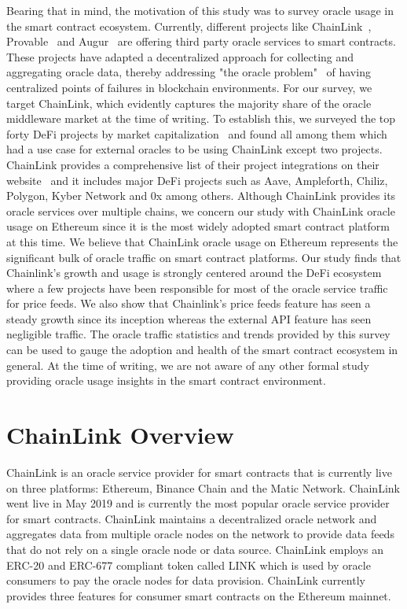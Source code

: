 \documentclass[runningheads]{llncs}
\begin{document}
Bearing that in mind, the motivation of this study was to survey oracle usage in the smart contract ecosystem. Currently, different projects like ChainLink~\cite{chainlink}, Provable~\cite{provable} and Augur~\cite{augur} are offering third party oracle services to smart contracts. These projects have adapted a decentralized approach for collecting and aggregating oracle data, thereby addressing "the oracle problem"~\cite{egberts2017oracle} of having centralized points of failures in blockchain environments. For our survey, we target ChainLink, which evidently captures the majority share of the oracle middleware market at the time of writing. To establish this, we surveyed the top forty DeFi projects by market capitalization~\cite{coinmardefi} and found all among them which had a use case for external oracles to be using ChainLink except two projects. ChainLink provides a comprehensive list of their project integrations on their website~\cite{chainlinkecosys} and it includes major DeFi projects such as Aave, Ampleforth, Chiliz, Polygon, Kyber Network and 0x among others. Although ChainLink provides its oracle services over multiple chains, we concern our study with ChainLink oracle usage on Ethereum since it is the most widely adopted smart contract platform at this time. We believe that ChainLink oracle usage on Ethereum represents the significant bulk of oracle traffic on smart contract platforms. Our study finds that Chainlink's growth and usage is strongly centered around the DeFi ecosystem where a few projects have been responsible for most of the oracle service traffic for price feeds. We also show that Chainlink's price feeds feature has seen a steady growth since its inception whereas the external API feature has seen negligible traffic. The oracle traffic statistics and trends provided by this survey can be used to gauge the adoption and health of the smart contract ecosystem in general.  At the time of writing, we are not aware of any other formal study providing oracle usage insights in the smart contract environment.

\section{ChainLink Overview}
ChainLink is an oracle service provider for smart contracts that is currently live on three platforms: Ethereum, Binance Chain and the Matic Network. ChainLink went live in May 2019 and is currently the most popular oracle service provider for smart contracts. ChainLink maintains a decentralized oracle network and aggregates data from multiple oracle nodes on the network to provide data feeds that do not rely on a single oracle node or data source\cite{chainlinkDoc}. ChainLink employs an ERC-20 and ERC-677 compliant token called LINK which is used by oracle consumers to pay the oracle nodes for data provision. ChainLink currently provides three features for consumer smart contracts on the Ethereum mainnet.
\end{document}

